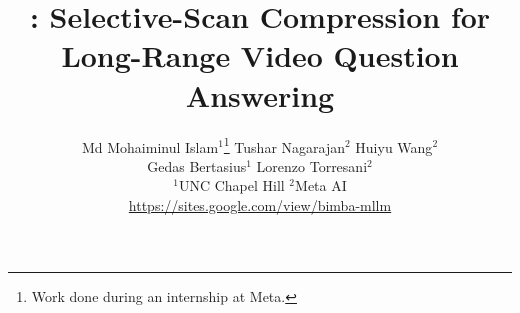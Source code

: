 \documentclass[10pt,twocolumn,letterpaper]{article}
\title{\model: Selective-Scan Compression for Long-Range Video Question Answering}
\author{Md Mohaiminul Islam$^1$\thanks{Work done during an internship at Meta.}
\quad
Tushar Nagarajan$^2$
\quad
Huiyu Wang$^2$
\\
Gedas Bertasius$^1$
\quad
Lorenzo Torresani$^2$
\\
$^1$UNC Chapel Hill \quad\quad $^2$Meta AI
\\
\href{https://sites.google.com/view/bimba-mllm}{https://sites.google.com/view/bimba-mllm}
}
\begin{document}
\maketitle
    








{
    \small
    
    
}



\end{document}

